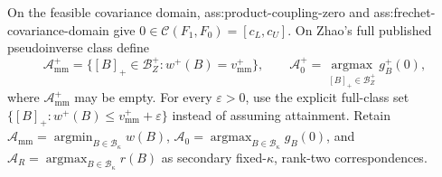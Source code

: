 On the feasible covariance domain, ass:product-coupling-zero and ass:frechet-covariance-domain give \(0\in\mathcal C(F_1,F_0)=[c_L,c_U]\).  On Zhao's full published pseudoinverse class define
\[
\mathcal A_{\mathrm{mm}}^+=\{[B]_+\in\mathcal B_Z^+:w^+(B)=v_{\mathrm{mm}}^+\},
\qquad
\mathcal A_0^+=\operatorname*{argmax}_{[B]_+\in\mathcal B_Z^+}g_B^+(0),
\]
where \(\mathcal A_{\mathrm{mm}}^+\) may be empty.  For every \(\varepsilon>0\), use the explicit full-class set \(\{[B]_+:w^+(B)\le v_{\mathrm{mm}}^++\varepsilon\}\) instead of assuming attainment.  Retain \(\mathcal A_{\mathrm{mm}}=\operatorname*{argmin}_{B\in\mathcal B_\kappa}w(B)\), \(\mathcal A_0=\operatorname*{argmax}_{B\in\mathcal B_\kappa}g_B(0)\), and \(\mathcal A_R=\operatorname*{argmax}_{B\in\mathcal B_\kappa}r(B)\) as secondary fixed-\(\kappa\), rank-two correspondences.